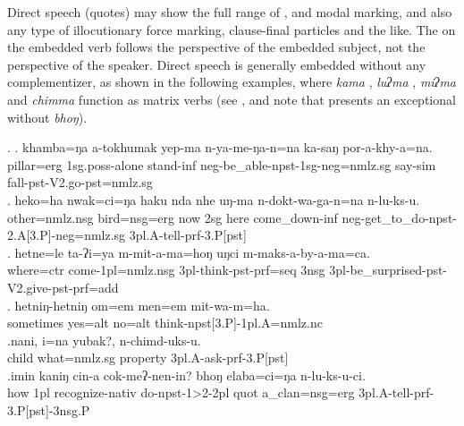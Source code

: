 Direct speech (quotes) may show the full range of ,  and modal marking, and also any type of illocutionary force marking, clause-final  particles and the like. The  on the embedded verb follows the perspective of the embedded subject, not the perspective of the speaker. Direct speech is generally embedded without any complementizer, as shown in the following examples, where \emph{kama} , \emph{luʔma} ,  \emph{miʔma}  and \emph{chimma}  function as matrix verbs (see \Next, and note that  \Next[e] presents an exceptional  without \emph{bhoŋ}).

\ex. \ag. khamba=ŋa a-tokhumak yep-ma n-ya-me-ŋa-n=na ka-saŋ por-a-khy-a=na.\\
pillar{\sc =erg} {\sc 1sg.poss}-alone stand{\sc -inf} {\sc neg-}be\_able{\sc -npst-1sg-neg=nmlz.sg} say{\sc -sim} fall{\sc [3sg]-pst-V2.go-pst=nmlz.sg}\\
 
\bg. heko=ha nwak=ci=ŋa haku nda nhe uŋ-ma n-dokt-wa-ga-n=na n-lu-ks-u.\\
	other{\sc =nmlz.nsg} bird{\sc =nsg=erg}	now {\sc 2sg} here come\_down{\sc -inf} {\sc neg-}get\_to\_do{\sc -npst-2.A[3.P]-neg=nmlz.sg} 	{\sc 3pl.A}-tell-{\sc prf-3.P[pst]}\\
	 
	\bg. hetne=le ta-ʔi=ya m-mit-a-ma=hoŋ uŋci m-maks-a-by-a-ma=ca.\\
	where{\sc =ctr} come{\sc -1pl=nmlz.nsg} {\sc 3pl-}think{\sc -pst-prf=seq} {\sc 3nsg} {\sc 3pl}-be\_surprised-{\sc pst-V2.give-pst-prf=add}\\
	 
\bg. hetniŋ-hetniŋ om=em men=em mit-wa-m=ha.\\
sometimes yes{\sc =alt} no{\sc =alt} think{\sc -npst[3.P]-1pl.A=nmlz.nc}\\
\bg.nani,  i=na           yubak?, n-chimd-uks-u.\\
child what{\sc =nmlz.sg} property {\sc 3pl.A-}ask{\sc -prf-3.P[pst]}\\
 
\bg.imin kaniŋ cin-a             cok-meʔ-nen-in?             bhoŋ elaba=ci=ŋa               n-lu-ks-u-ci.\\
how {\sc 1pl} recognize{\sc -nativ} do{\sc -npst-1>2-2pl} {\sc quot} a\_clan{\sc =nsg=erg} {\sc 3pl.A-}tell{\sc -prf-3.P[pst]-3nsg.P}\\
 


